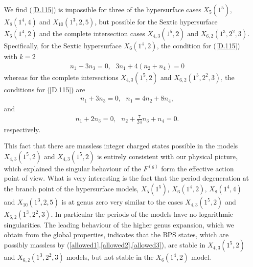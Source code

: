 \documentclass[12pt]{article}
\begin{document}
We find (\ref{D.115}) is impossible for three of the hypersurface
cases $X_5(1^5)$, $X_8(1^4,4)$ and $X_{10}(1^3,2,5)$, but possible
for the Sextic hypersurface $X_6(1^4,2)$ and the complete
intersection cases $X_{4,3}(1^5,2)$ and $X_{6,2}(1^3,2^2,3)$.
Specifically, for the Sextic hypersurface $X_6(1^4,2)$, the
condition for (\ref{D.115}) with $k=2$
\begin{eqnarray}
n_1+3n_3=0, ~~~ 3n_1+4(n_2+n_4)=0
\label{allowed1}
\end{eqnarray}
whereas for the complete intersections  $X_{4,3}(1^5,2)$ and
$X_{6,2}(1^3,2^2,3)$, the conditions for (\ref{D.115}) are
\begin{eqnarray}
n_1+3n_3=0, ~~~ n_1=4n_2+8n_4,
\label{allowed2}
\end{eqnarray}
and
\begin{eqnarray}
n_1+2n_3=0, ~~~ n_2+\frac{7}{24}n_3+n_4=0.
\label{allowed3}
\end{eqnarray}
respectively.

This fact that there are massless integer charged states possible
in the models $X_{4,3}(1^5,2)$ and  $X_{4,3}(1^5,2)$ is entirely
consistent with our physical picture, which explained the singular
behaviour of the $F^{(g)}$ form the effective action point of
view. What is very interesting is the fact that the period
degeneration at the branch point of the hypersurface models,
$X_5(1^5)$,  $X_6(1^4,2)$, $X_8(1^4,4)$ and  $X_{10}(1^3,2,5)$  
is at genus zero very similar to the cases $X_{4,3}(1^5,2)$ and  $X_{6,2}(1^3,2^2,3)$.
In particular the periods of the models have no logarithmic singularities. 
The leading behaviour of the higher genus expansion, which we obtain 
from the global properties, indicates that the BPS states,  
which are possibly massless by (\ref{allowed1},\ref{allowed2},\ref{allowed3}),   
are stable in  $X_{4,3}(1^5,2)$  and  $X_{6,2}(1^3,2^2,3)$ models, 
but  not stable in the  $X_6(1^4,2)$ model.  


\end{document}
